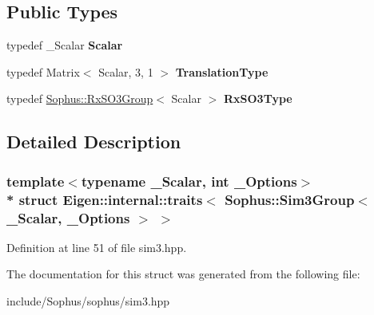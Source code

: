\subsection*{Public Types}
\begin{DoxyCompactItemize}
\item 
typedef \+\_\+\+Scalar {\bfseries Scalar}\hypertarget{struct_eigen_1_1internal_1_1traits_3_01_sophus_1_1_sim3_group_3_01___scalar_00_01___options_01_4_01_4_acfdcab003f951d272e4ba196c1fca790}{}\label{struct_eigen_1_1internal_1_1traits_3_01_sophus_1_1_sim3_group_3_01___scalar_00_01___options_01_4_01_4_acfdcab003f951d272e4ba196c1fca790}

\item 
typedef Matrix$<$ Scalar, 3, 1 $>$ {\bfseries Translation\+Type}\hypertarget{struct_eigen_1_1internal_1_1traits_3_01_sophus_1_1_sim3_group_3_01___scalar_00_01___options_01_4_01_4_ad1187abb4e1ddd88eae8e60c804e84b6}{}\label{struct_eigen_1_1internal_1_1traits_3_01_sophus_1_1_sim3_group_3_01___scalar_00_01___options_01_4_01_4_ad1187abb4e1ddd88eae8e60c804e84b6}

\item 
typedef \hyperlink{class_sophus_1_1_rx_s_o3_group}{Sophus\+::\+Rx\+S\+O3\+Group}$<$ Scalar $>$ {\bfseries Rx\+S\+O3\+Type}\hypertarget{struct_eigen_1_1internal_1_1traits_3_01_sophus_1_1_sim3_group_3_01___scalar_00_01___options_01_4_01_4_a1342fc05f9b0c462978d53bf78ea490d}{}\label{struct_eigen_1_1internal_1_1traits_3_01_sophus_1_1_sim3_group_3_01___scalar_00_01___options_01_4_01_4_a1342fc05f9b0c462978d53bf78ea490d}

\end{DoxyCompactItemize}


\subsection{Detailed Description}
\subsubsection*{template$<$typename \+\_\+\+Scalar, int \+\_\+\+Options$>$\\*
struct Eigen\+::internal\+::traits$<$ Sophus\+::\+Sim3\+Group$<$ \+\_\+\+Scalar, \+\_\+\+Options $>$ $>$}



Definition at line 51 of file sim3.\+hpp.



The documentation for this struct was generated from the following file\+:\begin{DoxyCompactItemize}
\item 
include/\+Sophus/sophus/sim3.\+hpp\end{DoxyCompactItemize}

